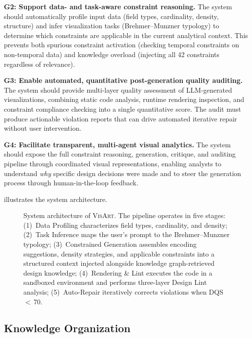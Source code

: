 \documentclass[final,5p,times,twocolumn]{elsarticle}
\newcommand{\sysname}{\textsc{VisArt}}
\begin{document}
\textbf{G2: Support data- and task-aware constraint reasoning.} The system should automatically profile input data (field types, cardinality, density, structure) and infer visualization tasks (Brehmer--Munzner typology) to determine which constraints are applicable in the current analytical context. This prevents both spurious constraint activation (checking temporal constraints on non-temporal data) and knowledge overload (injecting all 42 constraints regardless of relevance).

\textbf{G3: Enable automated, quantitative post-generation quality auditing.} The system should provide multi-layer quality assessment of LLM-generated visualizations, combining static code analysis, runtime rendering inspection, and constraint compliance checking into a single quantitative score. The audit must produce actionable violation reports that can drive automated iterative repair without user intervention.

\textbf{G4: Facilitate transparent, multi-agent visual analytics.} The system should expose the full constraint reasoning, generation, critique, and auditing pipeline through coordinated visual representations, enabling analysts to understand \textit{why} specific design decisions were made and to steer the generation process through human-in-the-loop feedback.

 illustrates the system architecture.

\begin{figure}[!t]
  \centering
  \caption{System architecture of \sysname{}. The pipeline operates in five stages: (1)~Data Profiling characterizes field types, cardinality, and density; (2)~Task Inference maps the user's prompt to the Brehmer--Munzner typology; (3)~Constrained Generation assembles encoding suggestions, density strategies, and applicable constraints into a structured context injected alongside knowledge graph-retrieved design knowledge; (4)~Rendering \& Lint executes the code in a sandboxed environment and performs three-layer Design Lint analysis; (5)~Auto-Repair iteratively corrects violations when DQS\,$<$\,70.}
  \label{fig:architecture}
\end{figure}

\subsection{Knowledge Organization}
\label{sec:graphrag}
\end{document}
